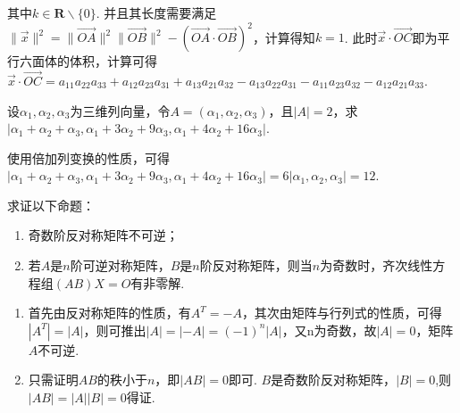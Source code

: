 \begin{exercise}
\begin{exgroup}
\begin{answer}
\begin{enumerate}
                其中$k\in\mathbf{R}\backslash\{0\}$. 并且其长度需要满足$\|\vec{x}\|^2=\|\overrightarrow{OA}\|^2\|\overrightarrow{OB}\|^2-(\overrightarrow{OA}\cdot\overrightarrow{OB})^2$，计算得知$k=1$. 此时$\vec{x}\cdot\overrightarrow{OC}$即为平行六面体的体积，计算可得$\vec{x}\cdot\overrightarrow{OC}=a_{11}a_{22}a_{33}+a_{12}a_{23}a_{31}+a_{13}a_{21}a_{32}-a_{13}a_{22}a_{31}-a_{11}a_{23}a_{32}-a_{12}a_{21}a_{33}$.
            \end{enumerate}
        \end{answer}
        \item 设$\alpha_1,\alpha_2,\alpha_3$为三维列向量，令$A=(\alpha_1,\alpha_2,\alpha_3)$，且$|A|=2$，求$|\alpha_1+\alpha_2+\alpha_3,\alpha_1+3\alpha_2+9\alpha_3,\alpha_1+4\alpha_2+16\alpha_3|$.
        \begin{answer}
            使用倍加列变换的性质，可得$|\alpha_1+\alpha_2+\alpha_3,\alpha_1+3\alpha_2+9\alpha_3,\alpha_1+4\alpha_2+16\alpha_3|=6|\alpha_1,\alpha_2,\alpha_3|=12$.
        \end{answer}

        \item 求证以下命题：
        \begin{enumerate}
            \item 奇数阶反对称矩阵不可逆；

            \item 若$A$是$n$阶可逆对称矩阵，$B$是$n$阶反对称矩阵，则当$n$为奇数时，齐次线性方程组$(AB)X=O$有非零解.
        \end{enumerate}
        \begin{answer}
            \begin{enumerate}
                \item 首先由反对称矩阵的性质，有$A^T=-A$，其次由矩阵与行列式的性质，可得$|A^T|=|A|$，则可推出$|A|=|-A|=(-1)^n|A|$，又n为奇数，故$|A|=0$，矩阵$A$不可逆.

                \item 只需证明$AB$的秩小于$n$，即$|AB|=0$即可. $B$是奇数阶反对称矩阵，$|B|=0$,则$|AB|=|A||B|=0$得证.
            \end{enumerate}
        \end{answer}


\end{exgroup}
\end{exercise}
